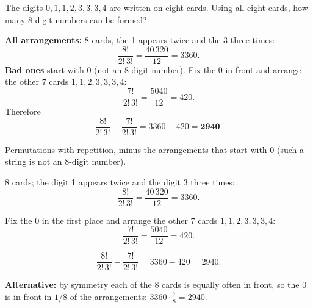
\begin{problem}
	The digits $0,1,1,2,3,3,3,4$ are written on eight cards. Using all eight
	cards, how many 8-digit numbers can be formed?
\end{problem}

\begin{slides}
	\small
	\exstatement
	\pause
	\sol \textbf{All arrangements:} 8 cards, the 1 appears twice and the 3
	three times:
	\[ \frac{8!}{2!\,3!} = \frac{40\,320}{12} = 3360. \]
	\textbf{Bad ones} start with $0$ (not an 8-digit number). Fix the $0$ in
	front and arrange the other 7 cards $1,1,2,3,3,3,4$:
	\[ \frac{7!}{2!\,3!}=\frac{5040}{12}=420. \]
	Therefore
	\[ \frac{8!}{2!\,3!}-\frac{7!}{2!\,3!} = 3360-420 = \mathbf{2940}. \]
\end{slides}

\begin{solution}
	\idea Permutations with repetition, minus the arrangements that start with
	$0$ (such a string is not an 8-digit number).

	 8 cards; the digit 1 appears twice and the
	digit 3 three times:
	\[ \frac{8!}{2!\,3!} = \frac{40\,320}{12} = 3360. \]

	 Fix the $0$ in the first place and arrange
	the other 7 cards $1,1,2,\allowbreak 3,3,3,4$:
	\[ \frac{7!}{2!\,3!} = \frac{5040}{12} = 420. \]

	\begin{answer}
		\[ \frac{8!}{2!\,3!}-\frac{7!}{2!\,3!} = 3360-420 = 2940. \]
	\end{answer}

	\begin{remark}
		\textbf{Alternative:} by symmetry each of the 8 cards is equally often in
		front, so the $0$ is in front in $1/8$ of the arrangements:
		$3360\cdot\frac78 = 2940$.
	\end{remark}
\end{solution}
